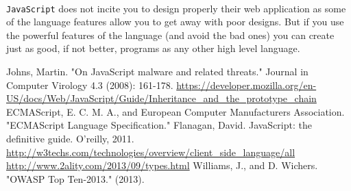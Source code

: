 \documentclass{report}
\begin{document}
\paragraph{}
\texttt{JavaScript} does not incite you to design properly their web application as some of the language features allow you to get away with poor designs. But if you use the powerful features of the language (and avoid the bad ones) you can create just as good, if not better, programs as any other high level language.
\begin{thebibliography}{99}
Johns, Martin. "On JavaScript malware and related threats." Journal in Computer Virology 4.3 (2008): 161-178.
\url{https://developer.mozilla.org/en-US/docs/Web/JavaScript/Guide/Inheritance\_and\_the\_prototype\_chain}
ECMAScript, E. C. M. A., and European Computer Manufacturers Association. "ECMAScript Language Specification."
Flanagan, David. JavaScript: the definitive guide. O'reilly, 2011.
\url{http://w3techs.com/technologies/overview/client_side_language/all}
    \url{http://www.2ality.com/2013/09/types.html}
Williams, J., and D. Wichers. "OWASP Top Ten-2013." (2013).
\end{thebibliography}
\end{document}
